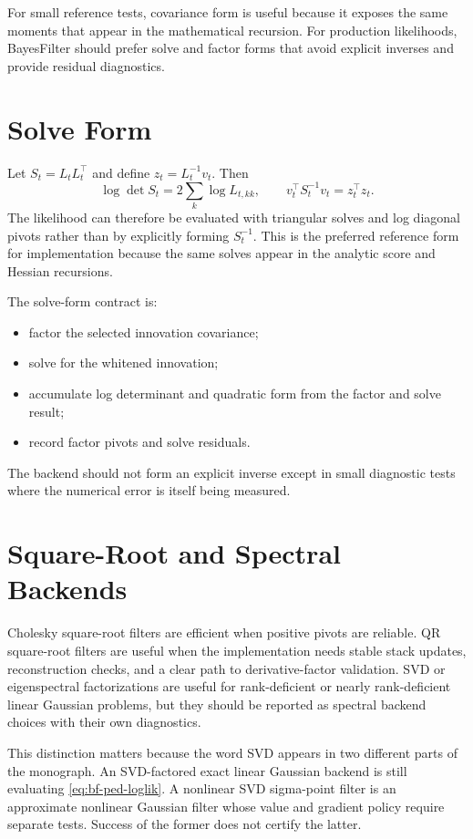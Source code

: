 For small reference tests, covariance form is useful because it exposes the
same moments that appear in the mathematical recursion.  For production
likelihoods, BayesFilter should prefer solve and factor forms that avoid
explicit inverses and provide residual diagnostics.

\section{Solve Form}
\label{sec:bf-solve-form-likelihood}

Let $S_t=L_tL_t^\top$ and define $z_t=L_t^{-1}v_t$.  Then
\[
  \log\det S_t = 2\sum_k \log L_{t,kk},
  \qquad
  v_t^\top S_t^{-1}v_t = z_t^\top z_t.
\]
The likelihood can therefore be evaluated with triangular solves and log
diagonal pivots rather than by explicitly forming $S_t^{-1}$.  This is the
preferred reference form for implementation because the same solves appear in
the analytic score and Hessian recursions.

The solve-form contract is:
\begin{itemize}
  \item factor the selected innovation covariance;
  \item solve for the whitened innovation;
  \item accumulate log determinant and quadratic form from the factor and
    solve result;
  \item record factor pivots and solve residuals.
\end{itemize}
The backend should not form an explicit inverse except in small diagnostic
tests where the numerical error is itself being measured.

\section{Square-Root and Spectral Backends}
\label{sec:bf-square-root-spectral-backends}

Cholesky square-root filters are efficient when positive pivots are reliable.
QR square-root filters are useful when the implementation needs stable stack
updates, reconstruction checks, and a clear path to derivative-factor
validation.  SVD or eigenspectral factorizations are useful for rank-deficient
or nearly rank-deficient linear Gaussian problems, but they should be reported
as spectral backend choices with their own diagnostics.

This distinction matters because the word SVD appears in two different parts
of the monograph.  An SVD-factored exact linear Gaussian backend is still
evaluating \eqref{eq:bf-ped-loglik}.  A nonlinear SVD sigma-point filter is an
approximate nonlinear Gaussian filter whose value and gradient policy require
separate tests.  Success of the former does not certify the latter.

